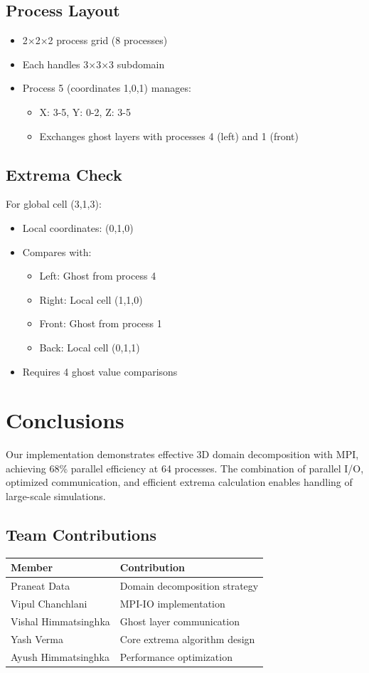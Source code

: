 \documentclass{article}
\begin{document}
\subsection{Process Layout}
\begin{itemize}
\item 2×2×2 process grid (8 processes)
\item Each handles 3×3×3 subdomain
\item Process 5 (coordinates 1,0,1) manages:
\begin{itemize}
\item X: 3-5, Y: 0-2, Z: 3-5
\item Exchanges ghost layers with processes 4 (left) and 1 (front)
\end{itemize}
\end{itemize}

\subsection{Extrema Check}
For global cell (3,1,3):
\begin{itemize}
\item Local coordinates: (0,1,0)
\item Compares with:
\begin{itemize}
\item Left: Ghost from process 4
\item Right: Local cell (1,1,0)
\item Front: Ghost from process 1
\item Back: Local cell (0,1,1)
\end{itemize}
\item Requires 4 ghost value comparisons
\end{itemize}

\section{Conclusions}
Our implementation demonstrates effective 3D domain decomposition with MPI, achieving 68\% parallel efficiency at 64 processes. The combination of parallel I/O, optimized communication, and efficient extrema calculation enables handling of large-scale simulations.

\subsection*{Team Contributions}
\begin{tabularx}{\textwidth}{|l|X|}
\hline
\textbf{Member} & \textbf{Contribution} \\
\hline
Praneat Data & Domain decomposition strategy \\
Vipul Chanchlani & MPI-IO implementation \\
Vishal Himmatsinghka & Ghost layer communication \\
Yash Verma & Core extrema algorithm design \\
Ayush Himmatsinghka & Performance optimization \\
\hline
\end{tabularx}
\end{document}
